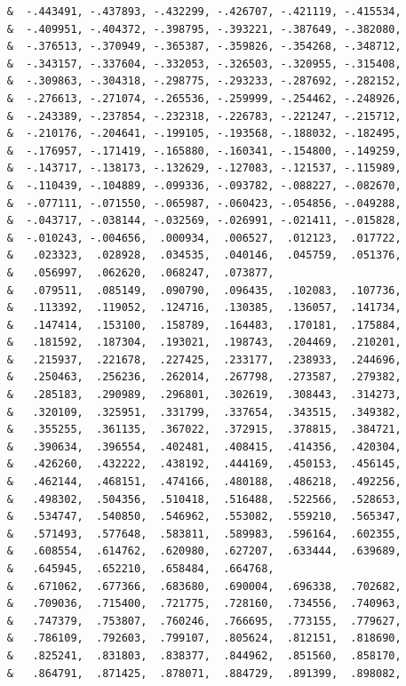 \begin{lstlisting}
     &  -.443491, -.437893, -.432299, -.426707, -.421119, -.415534,
     &  -.409951, -.404372, -.398795, -.393221, -.387649, -.382080,
     &  -.376513, -.370949, -.365387, -.359826, -.354268, -.348712,
     &  -.343157, -.337604, -.332053, -.326503, -.320955, -.315408,
     &  -.309863, -.304318, -.298775, -.293233, -.287692, -.282152,
     &  -.276613, -.271074, -.265536, -.259999, -.254462, -.248926,
     &  -.243389, -.237854, -.232318, -.226783, -.221247, -.215712,
     &  -.210176, -.204641, -.199105, -.193568, -.188032, -.182495,
     &  -.176957, -.171419, -.165880, -.160341, -.154800, -.149259,
     &  -.143717, -.138173, -.132629, -.127083, -.121537, -.115989,
     &  -.110439, -.104889, -.099336, -.093782, -.088227, -.082670,
     &  -.077111, -.071550, -.065987, -.060423, -.054856, -.049288,
     &  -.043717, -.038144, -.032569, -.026991, -.021411, -.015828,
     &  -.010243, -.004656,  .000934,  .006527,  .012123,  .017722,
     &   .023323,  .028928,  .034535,  .040146,  .045759,  .051376,
     &   .056997,  .062620,  .068247,  .073877,
     &   .079511,  .085149,  .090790,  .096435,  .102083,  .107736,
     &   .113392,  .119052,  .124716,  .130385,  .136057,  .141734,
     &   .147414,  .153100,  .158789,  .164483,  .170181,  .175884,
     &   .181592,  .187304,  .193021,  .198743,  .204469,  .210201,
     &   .215937,  .221678,  .227425,  .233177,  .238933,  .244696,
     &   .250463,  .256236,  .262014,  .267798,  .273587,  .279382,
     &   .285183,  .290989,  .296801,  .302619,  .308443,  .314273,
     &   .320109,  .325951,  .331799,  .337654,  .343515,  .349382,
     &   .355255,  .361135,  .367022,  .372915,  .378815,  .384721,
     &   .390634,  .396554,  .402481,  .408415,  .414356,  .420304,
     &   .426260,  .432222,  .438192,  .444169,  .450153,  .456145,
     &   .462144,  .468151,  .474166,  .480188,  .486218,  .492256,
     &   .498302,  .504356,  .510418,  .516488,  .522566,  .528653,
     &   .534747,  .540850,  .546962,  .553082,  .559210,  .565347,
     &   .571493,  .577648,  .583811,  .589983,  .596164,  .602355,
     &   .608554,  .614762,  .620980,  .627207,  .633444,  .639689,
     &   .645945,  .652210,  .658484,  .664768,
     &   .671062,  .677366,  .683680,  .690004,  .696338,  .702682,
     &   .709036,  .715400,  .721775,  .728160,  .734556,  .740963,
     &   .747379,  .753807,  .760246,  .766695,  .773155,  .779627,
     &   .786109,  .792603,  .799107,  .805624,  .812151,  .818690,
     &   .825241,  .831803,  .838377,  .844962,  .851560,  .858170,
     &   .864791,  .871425,  .878071,  .884729,  .891399,  .898082,

\end{lstlisting}
